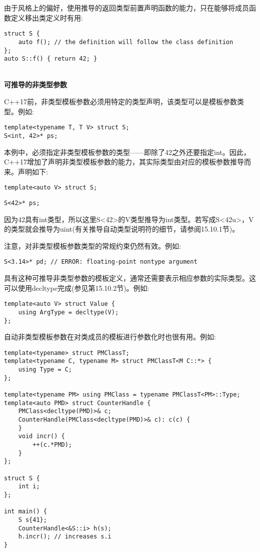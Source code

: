 由于风格上的偏好，使用推导的返回类型前置声明函数的能力，只在能够将成员函数定义移出类定义时有用:

\begin{lstlisting}[style=styleCXX]
struct S {
	auto f(); // the definition will follow the class definition
};
auto S::f() { return 42; }
\end{lstlisting}

\hspace*{\fill} \\ %
\noindent
\textbf{可推导的非类型参数}

C++17前，非类型模板参数必须用特定的类型声明，该类型可以是模板参数类型。例如:

\begin{lstlisting}[style=styleCXX]
template<typename T, T V> struct S;
S<int, 42>* ps;
\end{lstlisting}

本例中，必须指定非类型模板参数的类型——即除了42之外还要指定int。因此，C++17增加了声明非类型模板参数的能力，其实际类型由对应的模板参数推导而来。声明如下:

\begin{lstlisting}[style=styleCXX]
template<auto V> struct S;
\end{lstlisting}


\begin{lstlisting}[style=styleCXX]
S<42>* ps;
\end{lstlisting}

因为42具有int类型，所以这里S<42>的V类型推导为int类型。若写成S<42u>，V的类型就会推导为uint(有关推导自动类型说明符的细节，请参阅15.10.1节)。

注意，对非类型模板参数类型的常规约束仍然有效。例如:

\begin{lstlisting}[style=styleCXX]
S<3.14>* pd; // ERROR: floating-point nontype argument
\end{lstlisting}

具有这种可推导非类型参数的模板定义，通常还需要表示相应参数的实际类型。这可以使用decltype完成(参见第15.10.2节)。例如:

\begin{lstlisting}[style=styleCXX]
template<auto V> struct Value {
	using ArgType = decltype(V);
};
\end{lstlisting}

自动非类型模板参数在对类成员的模板进行参数化时也很有用。例如:

\begin{lstlisting}[style=styleCXX]
template<typename> struct PMClassT;
template<typename C, typename M> struct PMClassT<M C::*> {
	using Type = C;
};

template<typename PM> using PMClass = typename PMClassT<PM>::Type;
template<auto PMD> struct CounterHandle {
	PMClass<decltype(PMD)>& c;
	CounterHandle(PMClass<decltype(PMD)>& c): c(c) {
	}
	void incr() {
		++(c.*PMD);
	}
};

struct S {
	int i;
};

int main() {
	S s{41};
	CounterHandle<&S::i> h(s);
	h.incr(); // increases s.i
}
\end{lstlisting}

